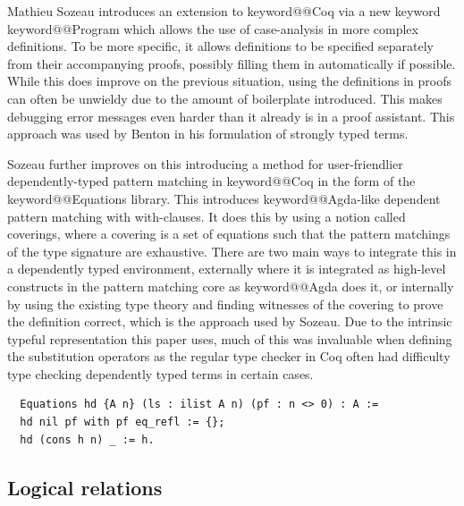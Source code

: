 \documentclass[11pt, final]{article}
\makeatletter
\def\<#1>{\csname keyword@@#1\endcsname}
\makeatother
\begin{document}
Mathieu Sozeau introduces an extension to \<Coq> via a new keyword \<Program> which allows the use of case-analysis in more complex definitions\cite{Sozeau2006}\cite{Sozeau2007}.
To be more specific, it allows definitions to be specified separately from their accompanying proofs, possibly filling them in automatically if possible.
While this does improve on the previous situation, using the definitions in proofs can often be unwieldy due to the amount of boilerplate introduced.
This makes debugging error messages even harder than it already is in a proof assistant. This approach was used by Benton in his formulation of strongly typed terms.

Sozeau further improves on this introducing a method for user-friendlier dependently-typed pattern matching in \<Coq> in the form of the \<Equations> library\cite{Sozeau2010}\cite{Sozeau2019}.
This introduces \<Agda>-like dependent pattern matching with with-clauses.
It does this by using a notion called coverings, where a covering is a set of equations such that the pattern matchings of the type signature are exhaustive.
There are two main ways to integrate this in a dependently typed environment, externally where it is integrated as high-level constructs in the pattern matching core as \<Agda> does it, or internally by using the existing type theory and finding witnesses of the covering to prove the definition correct, which is the approach used by Sozeau.
Due to the intrinsic typeful representation this paper uses, much of this was invaluable when defining the substitution operators as the regular type checker in Coq often had difficulty type checking dependently typed terms in certain cases.

\begin{listing}
  \begin{verbatim}
  Equations hd {A n} (ls : ilist A n) (pf : n <> 0) : A :=
  hd nil pf with pf eq_refl := {};
  hd (cons h n) _ := h.
  \end{verbatim}
  \caption{Definition of hd using \<Equations>}
  \label{lst:dt_ilist_hd_equations}
\end{listing}


\subsection{Logical relations}
\end{document}

